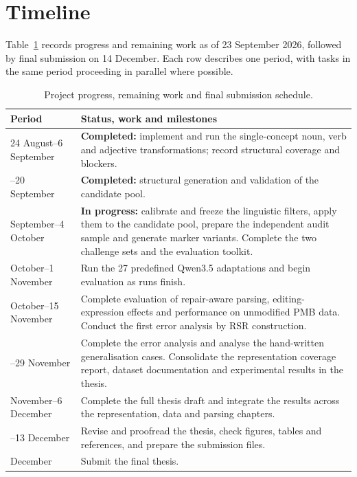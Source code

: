 \section{Timeline}
\label{sec:timeline}

Table~\ref{tab:timeline} records progress and remaining work as of 23 September
2026, followed by final submission on 14 December. Each row describes one
period, with tasks in the same period proceeding in parallel where possible.

\begin{table}[ht]
\centering
\small
\setlength{\tabcolsep}{4pt}
\begin{tabular}{@{}p{}p{}@{}}
\toprule
\textbf{Period} & \textbf{Status, work and milestones} \\
\midrule
24 August--6 September
  & \textbf{Completed:} implement and run the single-concept noun, verb and
    adjective transformations; record structural coverage and blockers. \\
\addlinespace
7--20 September
  & \textbf{Completed:} structural generation and validation of the candidate
    pool. \\
\addlinespace
21 September--4 October
  & \textbf{In progress:} calibrate and freeze the linguistic filters, apply
    them to the candidate pool, prepare the independent audit sample and
    generate marker variants. Complete the two challenge sets and the
    evaluation toolkit. \\
\addlinespace
5 October--1 November
  & Run the 27 predefined Qwen3.5 adaptations and begin evaluation as
    runs finish. \\
\addlinespace
26 October--15 November
  & Complete evaluation of repair-aware parsing, editing-expression effects and
    performance on unmodified PMB data. Conduct the first error analysis by
    RSR construction.  \\
\addlinespace
16--29 November
  & Complete the error analysis and analyse the hand-written generalisation
    cases. Consolidate the representation coverage report, dataset documentation
    and experimental results in the thesis. \\
\addlinespace
30 November--6 December
  & Complete the full thesis draft and integrate the results across the
    representation, data and parsing chapters. \\
\addlinespace
7--13 December
  & Revise and proofread the thesis, check figures, tables and references, and
    prepare the submission files. \\
\addlinespace
14 December
  & Submit the final thesis. \\
\bottomrule
\end{tabular}
\caption{Project progress, remaining work and final submission schedule.}
\label{tab:timeline}
\end{table}